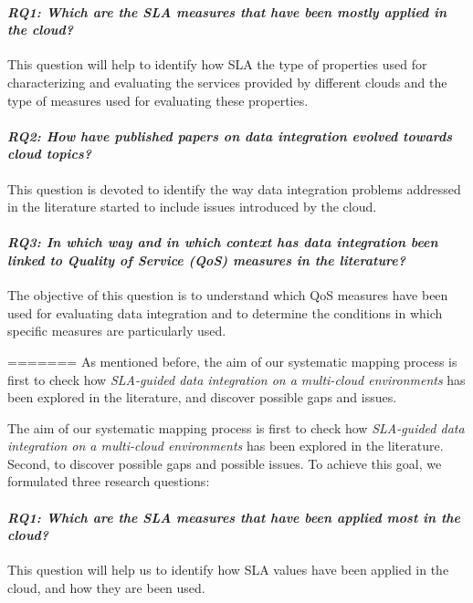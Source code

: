 \paragraph{\textit{\textbf{RQ1:} Which are the SLA measures that have been mostly
applied  in the cloud?}} This question will help  to identify how SLA the type of properties used for characterizing and evaluating the services provided  by different clouds and the type of measures used for evaluating these properties.


\paragraph{ \textit{\textbf{RQ2:}  How have published papers on data
 integration evolved towards cloud topics?}} This question is devoted to identify the way  data integration problems addressed in the literature started  to include issues introduced by the cloud.

\paragraph{\textit{\textbf{RQ3:} In which way and in which context has data integration been linked to Quality of Service (QoS) measures in the literature?}} The objective of this question is to understand which QoS measures have been used for evaluating data integration and to determine the conditions in which  specific measures are particularly used.

=======
As mentioned before, the aim of our systematic mapping process is first to
check how \textit{SLA-guided data integration on a
multi-cloud environments} has been explored in the literature, and discover
possible gaps and issues.

The aim of our systematic mapping process is first to check how
\textit{SLA-guided data integration on a multi-cloud environments} has been
explored in the literature. Second, to discover possible gaps and possible
issues. To achieve this goal, we formulated three research questions:    


\paragraph{\textit{\textbf{RQ1:} Which are the SLA measures that have been
applied most in the cloud?}} This question will help us to identify how SLA
values have been applied in the cloud, and how they are been used.

